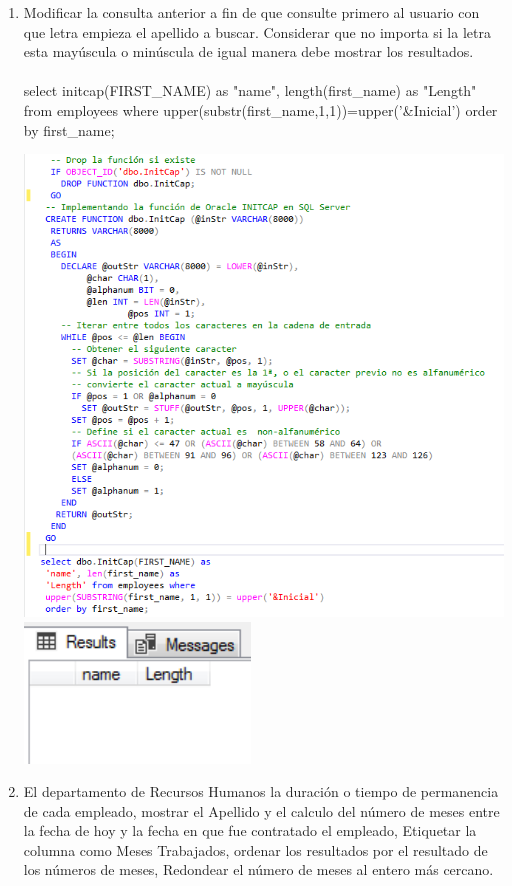\begin{enumerate}[1.]
	\item Modificar la consulta anterior a fin de que consulte primero al usuario con que letra empieza el apellido a buscar. Considerar que no importa si la letra esta may\'uscula o min\'uscula de igual manera debe mostrar los resultados.
	\\
	\\select initcap(FIRST\_NAME) as "name", length(first\_name) as "Length" from employees where upper(substr(first\_name,1,1))=upper('\&Inicial') order by first\_name;
	\begin{center}
	\includegraphics[width=17cm]{./Imagenes/actividad_05_05a}
	\includegraphics[width=6cm]{./Imagenes/actividad_05_05}
	\end{center}
	\item El departamento de Recursos Humanos la duración o tiempo de permanencia de cada empleado, mostrar el Apellido y el calculo del número de meses entre la fecha de hoy y la fecha en que fue contratado el empleado, Etiquetar la columna como Meses Trabajados, ordenar los resultados por el resultado de los n\'umeros de meses, Redondear el número de meses al entero más cercano.

\end{enumerate}
